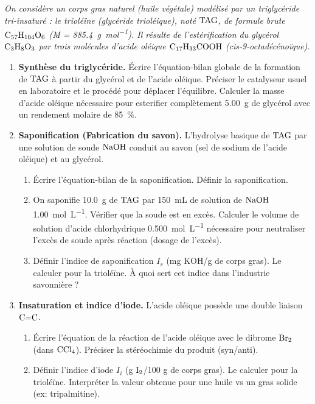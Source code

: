 \documentclass[11pt]{article}
\begin{document}
\begin{exercice}
\emph{On considère un corps gras naturel (huile végétale) modélisé par un triglycéride tri-insaturé : le trioléïne (glycéride trioléique), noté $\ce{TAG}$, de formule brute $\ce{C57H104O6}$ (M = \SI{885,4}{g.mol^{-1}}). Il résulte de l'estérification du glycérol $\ce{C3H8O3}$ par trois molécules d'acide oléique $\ce{C17H33COOH}$ (cis-9-octadécénoïque).}
\begin{enumerate}
    \item \textbf{Synthèse du triglycéride.} Écrire l'équation-bilan globale de la formation de $\ce{TAG}$ à partir du glycérol et de l'acide oléique. Préciser le catalyseur usuel en laboratoire et le procédé pour déplacer l'équilibre. Calculer la masse d'acide oléique nécessaire pour esterifier complètement \SI{5,00}{g} de glycérol avec un rendement molaire de \SI{85}{\%}.
    \item \textbf{Saponification (Fabrication du savon).} L'hydrolyse basique de $\ce{TAG}$ par une solution de soude $\ce{NaOH}$ conduit au savon (sel de sodium de l'acide oléique) et au glycérol.
    \begin{enumerate}
        \item Écrire l'équation-bilan de la saponification. Définir la saponification.
        \item On saponifie \SI{10,0}{g} de $\ce{TAG}$ par \SI{150}{mL} de solution de $\ce{NaOH}$ \SI{1,00}{mol.L^{-1}}. Vérifier que la soude est en excès. Calculer le volume de solution d'acide chlorhydrique \SI{0,500}{mol.L^{-1}} nécessaire pour neutraliser l'excès de soude après réaction (dosage de l'excès).
        \item Définir l'indice de saponification $I_s$ (mg KOH/g de corps gras). Le calculer pour la trioléïne. À quoi sert cet indice dans l'industrie savonnière ?
    \end{enumerate}
    \item \textbf{Insaturation et indice d'iode.} L'acide oléique possède une double liaison $\ce{C=C}$.
    \begin{enumerate}
        \item Écrire l'équation de la réaction de l'acide oléique avec le dibrome $\ce{Br2}$ (dans $\ce{CCl4}$). Préciser la stéréochimie du produit (syn/anti).
        \item Définir l'indice d'iode $I_i$ (g $\ce{I2}$/100 g de corps gras). Le calculer pour la trioléïne. Interpréter la valeur obtenue pour une huile vs un gras solide (ex: tripalmitine).

\end{enumerate}
\end{enumerate}
\end{exercice}
\end{document}
